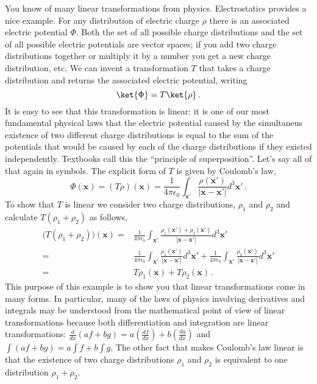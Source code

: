 You know of many linear transformations from physics.
Electrostatics provides a nice example.
For any distribution of electric charge $\rho$ there is an associated electric potential $\Phi$.
Both the set of all possible charge distributions and the set of all possible electric potentials are vector spaces; if you add two charge distributions together or multiply it by a number you get a new charge distribution, etc.
We can invent a transformation $T$ that takes a charge distribution and returns the associated electric potential, writing
\begin{displaymath}
  \ket{\Phi} = T\ket{\rho}
  \, .
\end{displaymath}
It is easy to see that this transformation is linear: it is one of our most fundamental physical laws that the electric potential caused by the simultaneus existence of two different charge distributions is equal to the sum of the potentials that would be caused by each of the charge distributions if they existed independently.
Textbooks call this the ``principle of superposition''.
Let's say all of that again in symbols.
The explicit form of $T$ is given by Coulomb's law,
\begin{displaymath}
  \Phi (\textbf{x}) =
  (T\rho )(\textbf{x}) = \frac{1}{4 \pi \epsilon _0} \int_{\textbf{x}'} \frac{\rho (\textbf{x}')}{|\textbf{x} - \textbf{x}'|} d^3 \textbf{x}'
  \, .
\end{displaymath}
To show that $T$ is linear we consider two charge distributions, $\rho_1$ and $\rho_2$ and calculate $T(\rho _1 + \rho_2)$ as follows,
\begin{align*}
  \bigl( T(\rho _1 + \rho _2)\bigr) (\textbf{x})
  =& \frac{1}{4 \pi \epsilon _0} \int_{\textbf{x}'} \frac{\rho _1 (\textbf{x}') + \rho _2 (\textbf{x}')}{|\textbf{x} - \textbf{x}'|} d^{3}\textbf{x}' \\
  =& \frac{1}{4 \pi \epsilon _0} \int_{\textbf{x}'} \frac{\rho _1 (\textbf{x}')}{|\textbf{x} - \textbf{x}'|} d^{3}\textbf{x}' + \frac{1}{4 \pi \epsilon _0} \int_{\textbf{x}'} \frac{\rho _2 (\textbf{x}')}{|\textbf{x} - \textbf{x}'|} d^{3}\textbf{x}' \\
  =& T\rho _1 (\textbf{x}) + T\rho _2 (\textbf{x})
  \,.
\end{align*}
This purpose of this example is to show you that linear transformations come in many forms.
In particular, many of the laws of physics involving derivatives and integrals may be understood from the mathematical point of view of linear transformations because both differentiation and integration are linear transformations: $\frac{d}{dx}(af + bg) = a(\frac{df}{dx}) + b(\frac{dg}{dx})$ and $\int(af + bg) = a\int{f} + b\int{g}$.
The other fact that makes Coulomb's law linear is that the existence of two charge distributions $\rho_1$ and $\rho_2$ is equivalent to one distribution $\rho_1 + \rho_2$.

